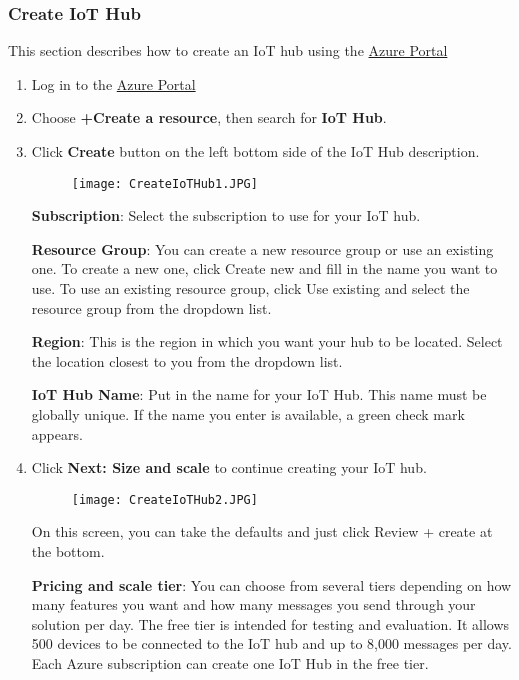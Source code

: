 \subsubsection{Create IoT Hub}
This section describes how to create an IoT hub using the \href{https://portal.azure.com}{Azure Portal}
\begin{enumerate}
    \item Log in to the \href{https://portal.azure.com}{Azure Portal}
    \item Choose \textbf{+Create a resource}, then search for \textbf{IoT Hub}.
    \item Click \textbf{Create} button on the left bottom side of the IoT Hub description.
    \begin{figure}[h]
        \centering
        \texttt{[image: CreateIoTHub1.JPG]}
    \end{figure}
    
    \textbf{Subscription}: Select the subscription to use for your IoT hub.
    
    \textbf{Resource Group}: You can create a new resource group or use an existing one. To create a new one, click Create new and fill in the name you want to use. To use an existing resource group, click Use existing and select the resource group from the dropdown list.
    
    \textbf{Region}: This is the region in which you want your hub to be located. Select the location closest to you from the dropdown list.

    \textbf{IoT Hub Name}: Put in the name for your IoT Hub. This name must be globally unique. If the name you enter is available, a green check mark appears. 
    \newpage
    \item Click \textbf{Next: Size and scale} to continue creating your IoT hub.
    \begin{figure}[h]
        \centering
        \texttt{[image: CreateIoTHub2.JPG]}
    \end{figure}
    
    On this screen, you can take the defaults and just click Review + create at the bottom.
    
    \textbf{Pricing and scale tier}: You can choose from several tiers depending on how many features you want and how many messages you send through your solution per day. The free tier is intended for testing and evaluation. It allows 500 devices to be connected to the IoT hub and up to 8,000 messages per day. Each Azure subscription can create one IoT Hub in the free tier.


\end{enumerate}
